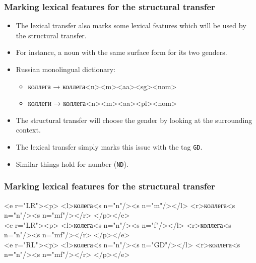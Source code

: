 \documentclass[10pt,xetex]{beamer} %
\begin{document}
\begin{frame}
  \frametitle{Marking lexical features for the structural transfer}

\begin{itemize}
\item The lexical transfer also marks some lexical features which will be used by the structural transfer.
\end{itemize}

\begin{block}{}
\begin{itemize}
\item For instance, a noun with the same surface form for its two genders.
\item Russian monolingual dictionary:
\begin{itemize}
  \item коллега → коллега<n><m><aa><sg><nom>
  \item коллеги → коллега<n><m><aa><pl><nom>
\end{itemize}
\item The structural transfer will choose the gender by looking at the surrounding context.
\item The lexical transfer simply marks this issue with the tag {\tt GD}.
\end{itemize}
\end{block}
\begin{itemize}
\item Similar things hold for number ({\tt ND}).
\end{itemize}

\end{frame}

\begin{frame}
  \frametitle{Marking lexical features for the structural transfer}
\begin{block}{}
<e r="LR"><p>
<l>колега<s n="n"/><s n="m"/></l>
<r>коллега<s n="n"/><s n="mf"/></r>
</p></e> \\
<e r="LR"><p>
<l>колега<s n="n"/><s n="f"/></l>
<r>коллега<s n="n"/><s n="mf"/></r>
</p></e> \\
<e r="RL"><p>
<l>колега<s n="n"/><s n="GD"/></l>
<r>коллега<s n="n"/><s n="mf"/></r> </p></e> \\
\end{block}
\end{frame}
\end{document}
